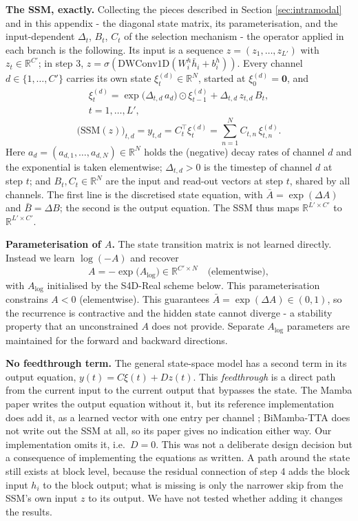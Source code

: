 \documentclass[10pt,a4paper,twocolumn]{article}
\newcommand{\R}{\mathbb{R}}
\begin{document}
		\textbf{The SSM, exactly.} Collecting the pieces described in Section \ref{sec:intramodal} and in this appendix - the diagonal state matrix, its parameterisation, and the input-dependent $\Delta_t$, $B_t$, $C_t$ of the selection mechanism - the operator applied in each branch is the following. Its input is a sequence $z = (z_1, \dots, z_{L'})$ with $z_t \in \R^{C'}$; in step 3, $z = \sigma(\text{DWConv1D}(W_i^h \bar{h}_i + b_i^h))$. Every channel $d \in \{1,\dots,C'\}$ carries its own state $\xi^{(d)}_t \in \R^N$, started at $\xi^{(d)}_0 = \mathbf{0}$, and
		$$\begin{multlined}\xi^{(d)}_t = \exp\bigl(\Delta_{t,d}\,a_d\bigr) \odot \xi^{(d)}_{t-1} + \Delta_{t,d}\, z_{t,d}\, B_t, \\ t = 1, \dots, L',\end{multlined}$$
		$$\bigl(\text{SSM}(z)\bigr)_{t,d} = y_{t,d} = C_t^{\top}\xi^{(d)}_t = \sum_{n=1}^{N} C_{t,n}\,\xi^{(d)}_{t,n}.$$
		Here $a_d = (a_{d,1}, \dots, a_{d,N}) \in \R^N$ holds the (negative) decay rates of channel $d$ and the exponential is taken elementwise; $\Delta_{t,d} > 0$ is the timestep of channel $d$ at step $t$; and $B_t, C_t \in \R^N$ are the input and read-out vectors at step $t$, shared by all channels. The first line is the discretised state equation, with $\bar{A} = \exp(\Delta A)$ and $\bar{B} = \Delta B$; the second is the output equation. The SSM thus maps $\R^{L' \times C'}$ to $\R^{L' \times C'}$.

		\textbf{Parameterisation of $A$.} The state transition matrix is not learned directly. Instead we learn $\log(-A)$ and recover $$A = -\exp\bigl(A_{\log}\bigr) \in \R^{C' \times N} \quad \text{(elementwise)},$$ with $A_{\log}$ initialised by the S4D-Real scheme below. This parameterisation
		constrains $A < 0$ (elementwise). This guarantees $\bar{A} = \exp(\Delta A) \in (0,1)$, so the recurrence is contractive and the hidden state cannot diverge - a stability property that an unconstrained $A$ does not provide. Separate $A_{\log}$ parameters are maintained for the forward and backward directions.

				\textbf{No feedthrough term.} The general state-space model has a second term in its output equation, $y(t) = C\xi(t) + D z(t)$. This \emph{feedthrough} is a direct path from the current input to the current output that bypasses the state. The Mamba paper writes the output equation without it, but its reference implementation does add it, as a learned vector with one entry per channel \cite{gu2023mamba}; BiMamba-TTA \cite{ziyu2025} does not write out the SSM at all, so its paper gives no indication either way. Our implementation omits it, i.e.\ $D = 0$. This was not a deliberate design decision but a consequence of implementing the equations as written. A path around the state still exists at block level, because the residual connection of step 4 adds the block input $h_i$ to the block output; what is missing is only the narrower skip from the SSM's own input $z$ to its output. We have not tested whether adding it changes the results.
\end{document}
